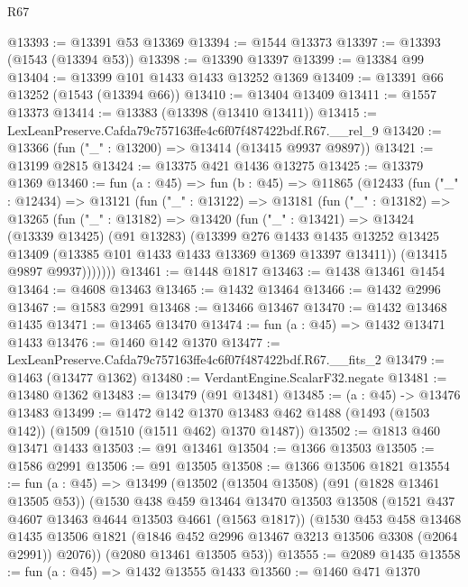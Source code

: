 \begin{lexlean}{R67}
\begin{coremodule}
@13393 := @13391 @53 @13369
@13394 := @1544 @13373
@13397 := @13393 (@1543 (@13394 @53))
@13398 := @13390 @13397
@13399 := @13384 @99
@13404 := @13399 @101 @1433 @1433 @13252 @1369
@13409 := @13391 @66 @13252 (@1543 (@13394 @66))
@13410 := @13404 @13409
@13411 := @1557 @13373
@13414 := @13383 (@13398 (@13410 @13411))
@13415 := LexLeanPreserve.Cafda79c757163ffe4c6f07f487422bdf.R67.__rel_9
@13420 := @13366 (fun ("_" : @13200) => @13414 (@13415 @9937 @9897))
@13421 := @13199 @2815
@13424 := @13375 @421 @1436 @13275
@13425 := @13379 @1369
@13460 := fun (a : @45) =>
  fun (b : @45) =>
  @11865
    (@12433
      (fun ("_" : @12434) =>
      @13121
        (fun ("_" : @13122) =>
        @13181
          (fun ("_" : @13182) =>
          @13265
            (fun ("_" : @13182) =>
            @13420
              (fun ("_" : @13421) =>
              @13424
                (@13339 @13425)
                (@91 @13283)
                (@13399
                  @276
                  @1433
                  @1435
                  @13252
                  @13425
                  @13409
                  (@13385 @101 @1433 @1433 @13369 @1369 @13397 @13411))
                (@13415 @9897 @9937)))))))
@13461 := @1448 @1817
@13463 := @1438 @13461 @1454
@13464 := @4608 @13463
@13465 := @1432 @13464
@13466 := @1432 @2996
@13467 := @1583 @2991
@13468 := @13466 @13467
@13470 := @1432 @13468 @1435
@13471 := @13465 @13470
@13474 := fun (a : @45) => @1432 @13471 @1433
@13476 := @1460 @142 @1370
@13477 := LexLeanPreserve.Cafda79c757163ffe4c6f07f487422bdf.R67.__fits_2
@13479 := @1463 (@13477 @1362)
@13480 := VerdantEngine.ScalarF32.negate
@13481 := @13480 @1362
@13483 := @13479 (@91 @13481)
@13485 := (a : @45) -> @13476 @13483
@13499 := @1472
    @142
    @1370
    @13483
    @462
    @1488
    (@1493 (@1503 @142))
    (@1509 (@1510 (@1511 @462) @1370 @1487))
@13502 := @1813 @460 @13471 @1433
@13503 := @91 @13461
@13504 := @1366 @13503
@13505 := @1586 @2991
@13506 := @91 @13505
@13508 := @1366 @13506 @1821
@13554 := fun (a : @45) =>
  @13499
    (@13502
      (@13504 @13508)
      (@91 (@1828 @13461 @13505 @53))
      (@1530
        @438
        @459
        @13464
        @13470
        @13503
        @13508
        (@1521 @437 @4607 @13463 @4644 @13503 @4661 (@1563 @1817))
        (@1530
          @453
          @458
          @13468
          @1435
          @13506
          @1821
          (@1846 @452 @2996 @13467 @3213 @13506 @3308 (@2064 @2991))
          @2076))
      (@2080 @13461 @13505 @53))
@13555 := @2089 @1435
@13558 := fun (a : @45) => @1432 @13555 @1433
@13560 := @1460 @471 @1370

\end{coremodule}
\end{lexlean}
